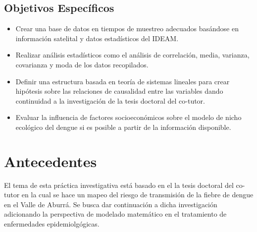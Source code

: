 \documentclass[11pt, oneside]{article}
\theoremstyle{definition}
\theoremstyle{remark}
\begin{document}
\subsection{Objetivos Específicos}
\begin{itemize}
	\item{Crear una base de datos en tiempos de muestreo adecuados basándose en información satelital y datos estadísticos del IDEAM.}
	\item{Realizar análisis estadísticos como el análisis de correlación, media, varianza, covarianza y moda de los datos recopilados.}
	\item{Definir una estructura basada en teoría de sistemas lineales para crear hipótesis sobre las relaciones de causalidad entre las variables dando continuidad a la investigación de la tesis doctoral del co-tutor.}
	\item{Evaluar la influencia de factores socioeconómicos sobre el modelo de nicho ecológico del dengue si es posible a partir de la información disponible.}
\end{itemize}

\section{Antecedentes}
El tema de esta práctica investigativa está basado en el la tesis doctoral del co-tutor en la cual se hace un mapeo del riesgo de transmisión de la fiebre de dengue en el Valle de Aburrá. Se busca dar continuación a dicha investigación adicionando la perspectiva de modelado matemático en el tratamiento de enfermedades epidemiolgógicas.
\end{document}
